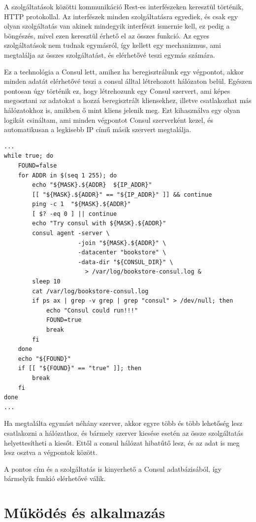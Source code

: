 \documentclass[11pt,magyar,a4paper,twoside,]{report}
\begin{document}
A szolgáltatások közötti kommunikáció Rest-es interfészeken keresztül
történik, HTTP protokollal. Az interfészek minden szolgáltatásra
egyediek, és csak egy olyan szolgáltatás van akinek mindegyik interfészt
ismernie kell, ez pedig a böngészés, mivel ezen keresztül érhető el az
összes funkció. Az egyes szolgáltatások nem tudnak egymásról, így
kellett egy mechanizmus, ami megtalálja az összes szolgáltatást, és
elérhetővé teszi egymás számára.

Ez a technológia a Consul lett, amihez ha beregisztrálunk egy végpontot,
akkor minden adatát elérhetővé teszi a consul álltal létrehozott
hálózaton belül. Egészen pontosan úgy történik ez, hogy létrehozunk egy
Consul szervert, ami képes megosztani az adatokat a hozzá beregisztrált
kliensekhez, illetve csatlakozhat más hálózatokhoz is, amikben ő mint
kliens jelenik meg. Ezt kihasználva egy olyan logikát csináltam, ami
minden végpontot Consul szerverként kezel, és automatikusan a legkisebb
IP című másik szervert megtalálja.

\begin{verbatim}
...
while true; do
    FOUND=false
    for ADDR in $(seq 1 255); do
        echo "${MASK}.${ADDR}  ${IP_ADDR}"
        [[ "${MASK}.${ADDR}" == "${IP_ADDR}" ]] && continue
        ping -c 1  "${MASK}.${ADDR}"
        [ $? -eq 0 ] || continue
        echo "Try consul with ${MASK}.${ADDR}"
        consul agent -server \
                     -join "${MASK}.${ADDR}" \
                     -datacenter "bookstore" \
                     -data-dir "${CONSUL_DIR}" \
                       > /var/log/bookstore-consul.log &
        sleep 10
        cat /var/log/bookstore-consul.log
        if ps ax | grep -v grep | grep "consul" > /dev/null; then
            echo "Consul could run!!!"
            FOUND=true
            break
        fi
    done
    echo "${FOUND}"
    if [[ "${FOUND}" == "true" ]]; then
        break
    fi
done
...
\end{verbatim}

Ha megtalálta egymást néhány szerver, akkor egyre több és több lehetőség
lesz csatlakozni a hálózathoz, és bármely szerver kiesése esetén az
össze szolgáltatás helyettesítheti a kiesőt. Ettől a consul hálózat
hibatűtő lesz, és az adat is meg lesz osztva a végpontok között.

A pontos cím és a szolgáltatás is kinyerhető a Consul adatbázisából, így
bármelyik funkió elérhetővé válik.

\section{Működés és
alkalmazás}\label{mux171kuxf6duxe9s-uxe9s-alkalmazuxe1s}
\end{document}
